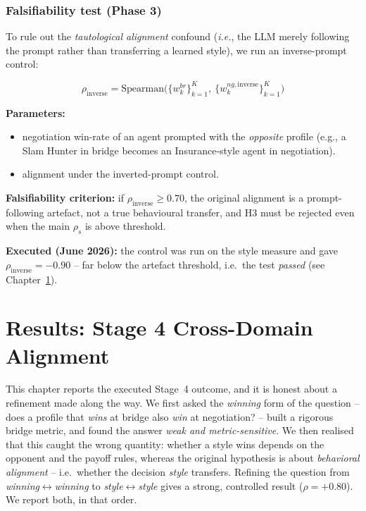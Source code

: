 \documentclass[11pt, a4paper, oneside, openany]{report}
\begin{document}
\subsection{Falsifiability test (Phase 3)}

To rule out the \emph{tautological alignment} confound (\textit{i.e.}, the LLM merely following the prompt rather than transferring a learned style), we run an inverse-prompt control:

\begin{equation}
\label{eq:falsify}
\rho_{\text{inverse}} = \mathrm{Spearman}\bigl(\{w_k^{br}\}_{k=1}^{K},\ \{w_k^{ng,\text{inverse}}\}_{k=1}^{K}\bigr)
\end{equation}

\noindent\textbf{Parameters:}
\begin{itemize}[leftmargin=2.6cm, itemsep=0pt, topsep=2pt]
    \item[$w_k^{ng,\text{inverse}}$] negotiation win-rate of an agent prompted with the \emph{opposite} profile (e.g., a Slam Hunter in bridge becomes an Insurance-style agent in negotiation).
    \item[$\rho_{\text{inverse}}$] alignment under the inverted-prompt control.
\end{itemize}

\noindent\textbf{Falsifiability criterion:} if $\rho_{\text{inverse}} \geq 0.70$, the original alignment is a prompt-following artefact, not a true behavioural transfer, and H3 must be rejected even when the main $\rho_s$ is above threshold.

\noindent\textbf{Executed (June 2026):} the control was run on the style measure and gave $\rho_{\text{inverse}} = -0.90$ -- far below the artefact threshold, i.e.\ the test \emph{passed} (see Chapter~\ref{ch:results}).

\chapter{Results: Stage 4 Cross-Domain Alignment}
\label{ch:results}

This chapter reports the executed Stage~4 outcome, and it is honest about a refinement made along the way. We first asked the \emph{winning} form of the question -- does a profile that \emph{wins} at bridge also \emph{win} at negotiation? -- built a rigorous bridge metric, and found the answer \emph{weak and metric-sensitive}. We then realised that this caught the wrong quantity: whether a style wins depends on the opponent and the payoff rules, whereas the original hypothesis is about \emph{behavioral alignment} -- i.e.\ whether the decision \emph{style} transfers. Refining the question from \emph{winning}$\leftrightarrow$\emph{winning} to \emph{style}$\leftrightarrow$\emph{style} gives a strong, controlled result ($\rho = +0.80$). We report both, in that order.
\end{document}
